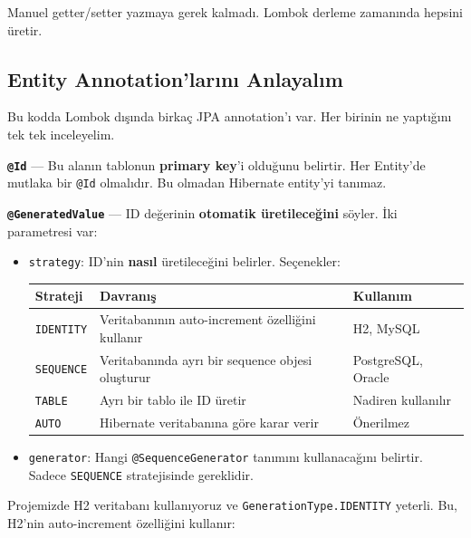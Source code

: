 \documentclass[11pt,a4paper]{article}
\begin{document}
Manuel getter/setter yazmaya gerek kalmad{\i}. Lombok derleme zaman{\i}nda hepsini \"{u}retir.

\subsection*{Entity Annotation'lar{\i}n{\i} Anlayal{\i}m}

Bu kodda Lombok d{\i}\c{s}{\i}nda birka\c{c} JPA annotation'{\i} var. Her birinin ne yapt{\i}\u{g}{\i}n{\i} tek tek inceleyelim.

\textbf{\texttt{@Id}} --- Bu alan{\i}n tablonun \textbf{primary key}'i oldu\u{g}unu belirtir. Her Entity'de mutlaka bir \texttt{@Id} olmal{\i}d{\i}r. Bu olmadan Hibernate entity'yi tan{\i}maz.

\textbf{\texttt{@GeneratedValue}} --- ID de\u{g}erinin \textbf{otomatik \"{u}retilece\u{g}ini} s\"{o}yler. \.{I}ki parametresi var:

\begin{itemize}
    \item \texttt{strategy}: ID'nin \textbf{nas{\i}l} \"{u}retilece\u{g}ini belirler. Se\c{c}enekler:
    \begin{center}
    \begin{tabular}{llp{6cm}}
    \toprule
    \textbf{Strateji} & \textbf{Davran{\i}\c{s}} & \textbf{Kullan{\i}m} \\
    \midrule
    \texttt{IDENTITY} & Veritaban{\i}n{\i}n auto-increment \"{o}zelli\u{g}ini kullan{\i}r & H2, MySQL \\
    \texttt{SEQUENCE} & Veritaban{\i}nda ayr{\i} bir sequence objesi olu\c{s}turur & PostgreSQL, Oracle \\
    \texttt{TABLE} & Ayr{\i} bir tablo ile ID \"{u}retir & Nadiren kullan{\i}l{\i}r \\
    \texttt{AUTO} & Hibernate veritaban{\i}na g\"{o}re karar verir & \"{O}nerilmez \\
    \bottomrule
    \end{tabular}
    \end{center}

    \item \texttt{generator}: Hangi \texttt{@SequenceGenerator} tan{\i}m{\i}n{\i} kullanaca\u{g}{\i}n{\i} belirtir. Sadece \texttt{SEQUENCE} stratejisinde gereklidir.
\end{itemize}

Projemizde H2 veritaban{\i} kullan{\i}yoruz ve \texttt{GenerationType.IDENTITY} yeterli. Bu, H2'nin auto-increment \"{o}zelli\u{g}ini kullan{\i}r:
\end{document}
